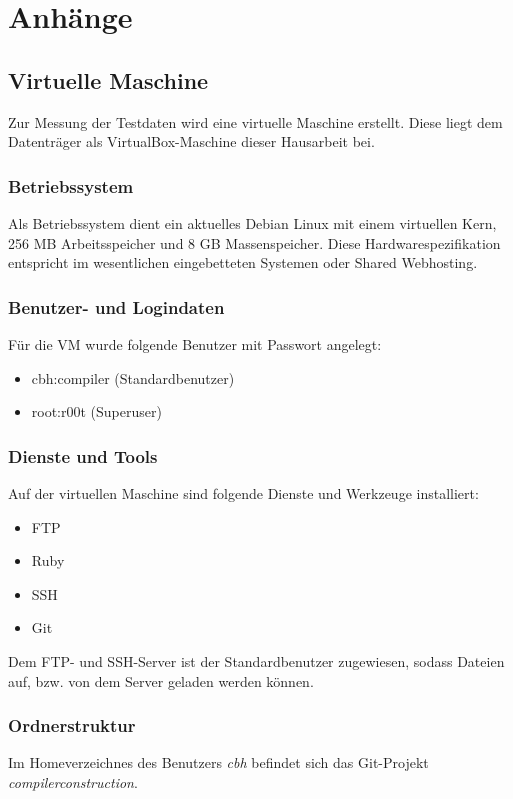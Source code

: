 \section{Anhänge}

\subsection{Virtuelle Maschine}
Zur Messung der Testdaten wird eine virtuelle Maschine erstellt. Diese liegt dem Datenträger als VirtualBox-Maschine dieser Hausarbeit bei. 

\subsubsection{Betriebssystem}
Als Betriebssystem dient ein aktuelles Debian Linux mit einem virtuellen Kern, 256 MB Arbeitsspeicher und 8 GB Massenspeicher. Diese Hardwarespezifikation entspricht im wesentlichen eingebetteten Systemen oder Shared Webhosting. 

\subsubsection{Benutzer- und Logindaten}

Für die VM wurde folgende Benutzer mit Passwort angelegt:
\begin{itemize}
    \item{cbh:compiler (Standardbenutzer)}
    \item{root:r00t (Superuser)}
\end{itemize}

\subsubsection{Dienste und Tools}

Auf der virtuellen Maschine sind folgende Dienste und Werkzeuge installiert: 

\begin{itemize}
    \item{FTP}
    \item{Ruby}
    \item{SSH}
    \item{Git}
\end{itemize}

Dem FTP- und SSH-Server ist der Standardbenutzer zugewiesen, sodass Dateien auf, bzw. von dem Server geladen werden können.

\subsubsection{Ordnerstruktur}
Im Homeverzeichnes des Benutzers \textit{cbh} befindet sich das Git-Projekt \textit{compilerconstruction}.
